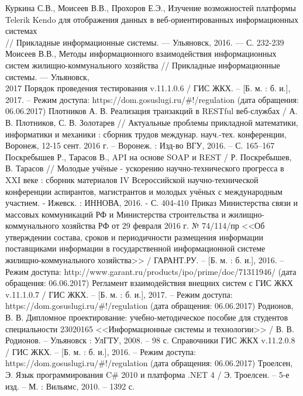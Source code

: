 \begin{thebibliography}{99}
	 Куркина С.В., Моисеев В.В., Прохоров Е.Э., Изучение возможностей платформы Telerik Kendo для отображения данных в веб-ориентированных информационных системах \\ // Прикладные информационные системы. — Ульяновск, 2016. — С. 232-239
	 Моисеев В.В., Методы информационного взаимодействия информационных систем жилищно-коммунального хозяйства // Прикладные информационные системы. — Ульяновск, \\ 2017
	 Порядок проведения тестирования v.11.1.0.6 / ГИС ЖКХ. – [Б. м. : б. и.], 2017. – Режим доступа: https://dom.gosuslugi.ru/\#!/regulation (дата обращения: 06.06.2017)
	 Плотников А. В. Реализация транзакций в RESTful веб-службах / А. В. Плотников, С. В. Золотарев // Актуальные проблемы прикладной математики, информатики и механики : сборник трудов междунар. науч.-тех. конференции, Воронеж, 12-15 сент. 2016 г. – Воронеж. : Изд-во ВГУ, 2016. – С. 165–167
	 Поскребышев Р., Тарасов В., API на основе SOAP и REST / Р. Поскребышев, В. Тарасов // Молодые учёные - ускорению научно-технического прогресса в XXI веке : сборник материалов IV Всероссийской научно-технической конференции аспирантов, магистрантов и молодых учёных с международным участием. - Ижевск. : ИННОВА, 2016. - С. 404-410
	 Приказ Министерства связи и массовых коммуникаций РФ и Министерства строительства и жилищно-коммунального хозяйства РФ от 29 февраля 2016 г. № 74/114/пр <<Об утверждении состава, сроков и периодичности размещения информации поставщиками информации в государственной информационной системе жилищно-коммунального хозяйства>> / ГАРАНТ.РУ. – [Б. м. : б. и.], 2016. – Режим доступа: http://www.garant.ru/products/ipo/prime/doc/71311946/ (дата обращения: 06.06.2017)
	 Регламент взаимодействия внещних систем с ГИС ЖКХ v.11.1.0.7 / ГИС ЖКХ. – [Б. м. : б. и.], 2017. – Режим доступа: https://dom.gosuslugi.ru/\#!/regulation (дата обращения: 06.06.2017)
	 Родионов, В. В. Дипломное проектирование: учебно-методическое пособие для студентов специальности 23020165 <<Информационные системы и технологии>> / В. В. Родионов. – Ульяновск : УлГТУ, 2008. – 98 с.
	 Справочники ГИС ЖКХ v.11.2.0.8 / ГИС ЖКХ. – [Б. м. : б. и.], 2016. – Режим доступа: https://dom.gosuslugi.ru/\#!/regulation (дата обращения: 06.06.2017)
	 Троелсен, Э. Язык программирования C\# 2010 и платформа .NET 4 / Э. Троелсен. – 5-е изд. – М. : Вильямс, 2010. – 1392 с.

\end{thebibliography}
